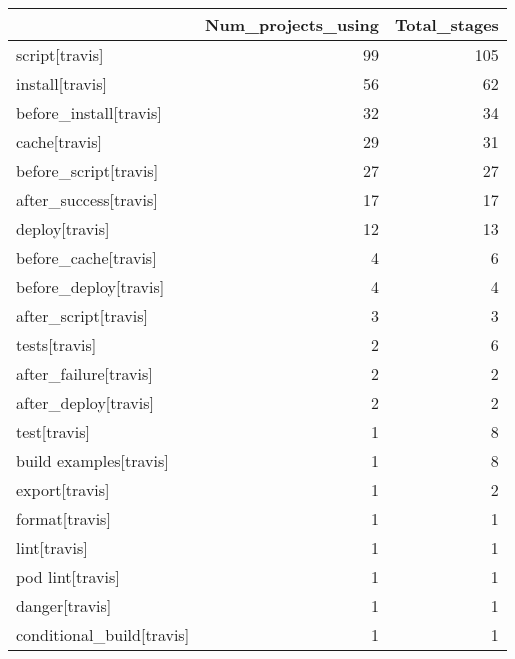 \begin{tabular}{lrr}
\toprule
{} &  Num\_projects\_using &  Total\_stages \\
\midrule
script[travis]            &                  99 &           105 \\
install[travis]           &                  56 &            62 \\
before\_install[travis]    &                  32 &            34 \\
cache[travis]             &                  29 &            31 \\
before\_script[travis]     &                  27 &            27 \\
after\_success[travis]     &                  17 &            17 \\
deploy[travis]            &                  12 &            13 \\
before\_cache[travis]      &                   4 &             6 \\
before\_deploy[travis]     &                   4 &             4 \\
after\_script[travis]      &                   3 &             3 \\
tests[travis]             &                   2 &             6 \\
after\_failure[travis]     &                   2 &             2 \\
after\_deploy[travis]      &                   2 &             2 \\
test[travis]              &                   1 &             8 \\
build examples[travis]    &                   1 &             8 \\
export[travis]            &                   1 &             2 \\
format[travis]            &                   1 &             1 \\
lint[travis]              &                   1 &             1 \\
pod lint[travis]          &                   1 &             1 \\
danger[travis]            &                   1 &             1 \\
conditional\_build[travis] &                   1 &             1 \\
\bottomrule
\end{tabular}
